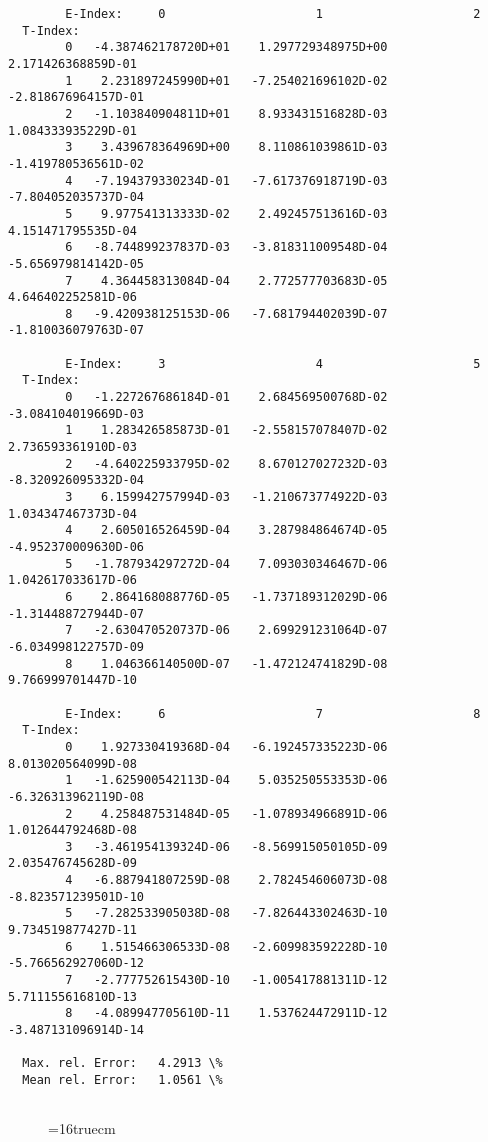 \documentclass[12pt,dvipdfmx]{article}
\begin{document}
{\begin{small}
\begin{verbatim}
        E-Index:     0                     1                     2
  T-Index:
        0   -4.387462178720D+01    1.297729348975D+00    2.171426368859D-01
        1    2.231897245990D+01   -7.254021696102D-02   -2.818676964157D-01
        2   -1.103840904811D+01    8.933431516828D-03    1.084333935229D-01
        3    3.439678364969D+00    8.110861039861D-03   -1.419780536561D-02
        4   -7.194379330234D-01   -7.617376918719D-03   -7.804052035737D-04
        5    9.977541313333D-02    2.492457513616D-03    4.151471795535D-04
        6   -8.744899237837D-03   -3.818311009548D-04   -5.656979814142D-05
        7    4.364458313084D-04    2.772577703683D-05    4.646402252581D-06
        8   -9.420938125153D-06   -7.681794402039D-07   -1.810036079763D-07

        E-Index:     3                     4                     5
  T-Index:
        0   -1.227267686184D-01    2.684569500768D-02   -3.084104019669D-03
        1    1.283426585873D-01   -2.558157078407D-02    2.736593361910D-03
        2   -4.640225933795D-02    8.670127027232D-03   -8.320926095332D-04
        3    6.159942757994D-03   -1.210673774922D-03    1.034347467373D-04
        4    2.605016526459D-04    3.287984864674D-05   -4.952370009630D-06
        5   -1.787934297272D-04    7.093030346467D-06    1.042617033617D-06
        6    2.864168088776D-05   -1.737189312029D-06   -1.314488727944D-07
        7   -2.630470520737D-06    2.699291231064D-07   -6.034998122757D-09
        8    1.046366140500D-07   -1.472124741829D-08    9.766999701447D-10

        E-Index:     6                     7                     8
  T-Index:
        0    1.927330419368D-04   -6.192457335223D-06    8.013020564099D-08
        1   -1.625900542113D-04    5.035250553353D-06   -6.326313962119D-08
        2    4.258487531484D-05   -1.078934966891D-06    1.012644792468D-08
        3   -3.461954139324D-06   -8.569915050105D-09    2.035476745628D-09
        4   -6.887941807259D-08    2.782454606073D-08   -8.823571239501D-10
        5   -7.282533905038D-08   -7.826443302463D-10    9.734519877427D-11
        6    1.515466306533D-08   -2.609983592228D-10   -5.766562927060D-12
        7   -2.777752615430D-10   -1.005417881311D-12    5.711155616810D-13
        8   -4.089947705610D-11    1.537624472911D-12   -3.487131096914D-14

  Max. rel. Error:   4.2913 \%
  Mean rel. Error:   1.0561 \%


\end{verbatim}\end{small}
\begin{figure} \label{2.2d}
\epsfxsize=16truecm
\end{figure}
\newpage


}
\end{document}
